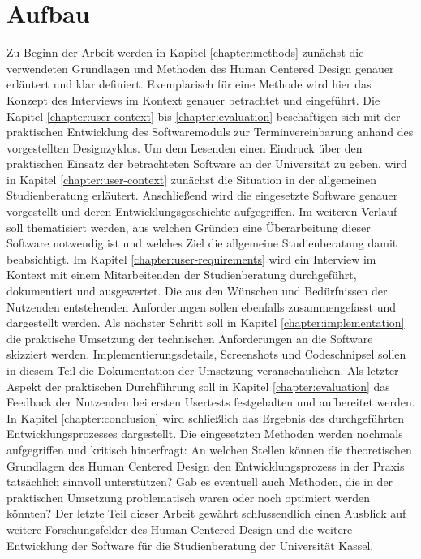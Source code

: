 \section{Aufbau}
Zu Beginn der Arbeit werden in Kapitel \ref{chapter:methods} zunächst die
verwendeten Grundlagen und Methoden des Human Centered Design genauer erläutert
und klar definiert. Exemplarisch für eine Methode wird hier das Konzept des
Interviews im Kontext genauer betrachtet und eingeführt. Die
Kapitel \ref{chapter:user-context} bis \ref{chapter:evaluation} beschäftigen sich
mit der praktischen Entwicklung des Softwaremoduls zur Terminvereinbarung
anhand des vorgestellten Designzyklus. Um dem Lesenden einen Eindruck über den
praktischen Einsatz der betrachteten Software an der Universität zu geben, wird
in Kapitel \ref{chapter:user-context} zunächst die Situation in der allgemeinen
Studienberatung erläutert. Anschließend wird die eingesetzte Software genauer
vorgestellt und deren Entwicklungsgeschichte aufgegriffen. Im weiteren Verlauf
soll thematisiert werden, aus welchen Gründen eine Überarbeitung dieser
Software notwendig ist und welches Ziel die allgemeine Studienberatung damit
beabsichtigt. Im Kapitel  \ref{chapter:user-requirements} wird ein Interview im
Kontext mit einem Mitarbeitenden der Studienberatung durchgeführt, dokumentiert
und ausgewertet. Die aus den Wünschen und Bedürfnissen der Nutzenden
entstehenden Anforderungen sollen ebenfalls zusammengefasst und dargestellt
werden. Als nächster Schritt soll in Kapitel \ref{chapter:implementation} die
praktische Umsetzung der technischen Anforderungen an die Software skizziert
werden. Implementierungsdetails, Screenshots und Codeschnipsel sollen in diesem
Teil die Dokumentation der Umsetzung veranschaulichen. Als letzter Aspekt der
praktischen Durchführung soll in Kapitel \ref{chapter:evaluation} das Feedback
der Nutzenden bei ersten Usertests festgehalten und aufbereitet werden. In
Kapitel \ref{chapter:conclusion} wird schließlich das Ergebnis des
durchgeführten Entwicklungsprozesses dargestellt. Die eingesetzten Methoden
werden nochmals aufgegriffen und kritisch hinterfragt: An welchen Stellen
können die theoretischen Grundlagen des Human Centered Design den
Entwicklungsprozess in der Praxis tatsächlich sinnvoll unterstützen? Gab es
eventuell auch Methoden, die in der praktischen Umsetzung problematisch waren
oder noch optimiert werden könnten? Der letzte Teil dieser Arbeit gewährt
schlussendlich einen Ausblick auf weitere Forschungsfelder des Human Centered
Design und die weitere Entwicklung der Software für die Studienberatung der
Universität Kassel.